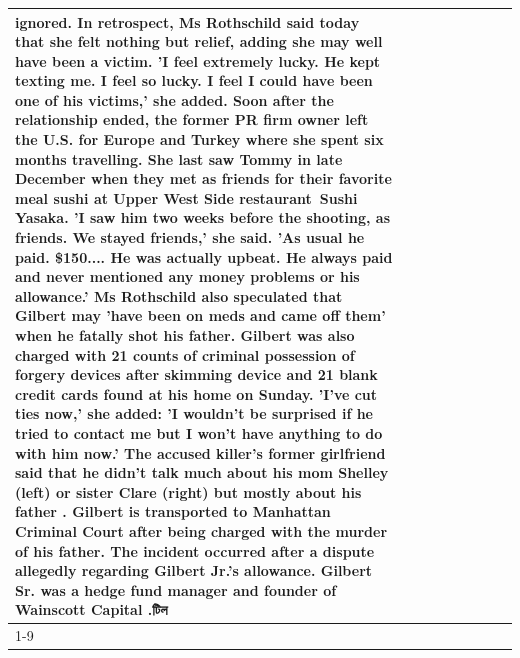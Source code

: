 \begin{table}[H]
\begin{tabular}{lllrlllll}
ignored. In retrospect, Ms Rothschild said today that she felt nothing but relief, adding she may well have been a victim. 'I feel extremely lucky. He kept texting me. I feel so lucky. I feel I could have been one of his victims,' she added. Soon after the relationship ended, the former PR firm owner left the U.S. for Europe and Turkey where she spent six months  travelling. She last saw Tommy in late December when they met as friends for their favorite meal sushi at Upper West Side restaurant Sushi Yasaka. 'I saw him two weeks before the shooting, as friends. We stayed friends,' she said. 'As usual he paid. \$150.... He was actually upbeat. He always paid and never mentioned any money problems or his allowance.' Ms Rothschild also speculated that Gilbert may 'have been on meds and came off them' when he fatally shot his father. Gilbert was also charged with 21 counts of criminal possession of forgery devices after skimming device and 21 blank credit cards found at his home on Sunday. 'I've cut ties now,' she added: 'I wouldn’t be surprised if he tried to contact me but I won’t have anything to do with him now.' The accused killer's former girlfriend said that he didn't talk much about his mom Shelley (left) or sister Clare (right) but mostly about his father . Gilbert is transported to Manhattan Criminal Court  after being charged with the murder of his father. The incident occurred after a dispute allegedly regarding Gilbert Jr.'s allowance. Gilbert Sr. was a hedge fund manager and founder of Wainscott Capital .টিল \\
\cline{1-9}

\end{tabular}
\end{table}
